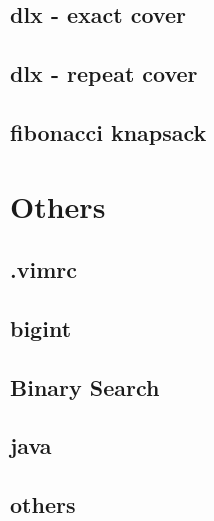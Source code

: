 \documentclass[a4paper,5pt,twocolumn,titlepage]{article}
\begin{document}
\subsection{dlx - exact cover}

\subsection{dlx - repeat cover}

\subsection{fibonacci knapsack}


\section{Others}
\subsection{.vimrc}

\subsection{bigint}

\subsection{Binary Search}

\subsection{java}

\subsection{others}

\end{document}

